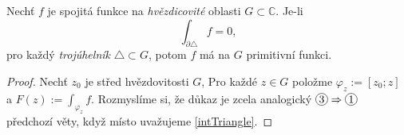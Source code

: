 \begin{amendment}
Nechť $f$ je spojitá funkce na \emph{hvězdicovité} oblasti $G\subset\mathbb{C}.$ Je-li
\begin{equation}\label{intTriangle}
    \int_{\partial\triangle}f=0\text{,}
\end{equation}
pro každý \emph{trojúhelník} $\triangle\subset G$, potom $f$ má na $G$ primitivní funkci.
\end{amendment}

\begin{proof}
Nechť $z_0$ je střed hvězdovitosti $G$, Pro každé $z\in G$ položme $\varphi_z:=[z_0;z]$ a $F(z):=\int_{\varphi_z}f\text{.}$ 
Rozmyslíme si, že důkaz
je zcela analogický $\circled{3}\Rightarrow\circled{1}$ předchozí věty, když místo  uvažujeme \cref{intTriangle}.%
\end{proof}
